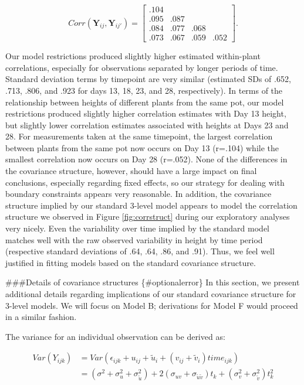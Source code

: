 \documentclass[
]{krantz}
\begin{document}
\[  Corr(\textbf{Y}_{ij},\textbf{Y}_{ij'}) = \left[
          \begin{array}{cccc}
            .104 & & & \\
            .095 & .087 & & \\
            .084 & .077 & .068 & \\
            .073 & .067 & .059 & .052
          \end{array} \right]. \]

Our model restrictions produced slightly higher estimated within-plant correlations, especially for observations separated by longer periods of time. Standard deviation terms by timepoint are very similar (estimated SDs of .652, .713, .806, and .923 for days 13, 18, 23, and 28, respectively). In terms of the relationship between heights of different plants from the same pot, our model restrictions produced slightly higher correlation estimates with Day 13 height, but slightly lower correlation estimates associated with heights at Days 23 and 28. For measurements taken at the same timepoint, the largest correlation between plants from the same pot now occurs on Day 13 (r=.104) while the smallest correlation now occurs on Day 28 (r=.052). None of the differences in the covariance structure, however, should have a large impact on final conclusions, especially regarding fixed effects, so our strategy for dealing with boundary constraints appears very reasonable. In addition, the covariance structure implied by our standard 3-level model appears to model the correlation structure we observed in Figure \ref{fig:corrstruct} during our exploratory analyses very nicely. Even the variability over time implied by the standard model matches well with the raw observed variability in height by time period (respective standard deviations of .64, .64, .86, and .91). Thus, we feel well justified in fitting models based on the standard covariance structure.

\#\#\#Details of covariance structures \{\#optionalerror\}
In this section, we present additional details regarding implications of our standard covariance structure for 3-level models. We will focus on Model B; derivations for Model F would proceed in a similar fashion.

The variance for an individual observation can be derived as:

\begin{align*}
Var(Y_{ijk}) & = Var(\epsilon_{ijk}+u_{ij}+\tilde{u}_{i}+(v_{ij}+\tilde{v}_{i})\textstyle{time}_{ijk}) \\
 & = (\sigma^{2} + \sigma_{u}^{2} + \sigma_{\tilde{u}}^{2}) + 2(\sigma_{uv} + \sigma_{\tilde{u}\tilde{v}})t_k + (\sigma_{v}^{2} + \sigma_{\tilde{v}}^{2})t_{k}^{2}
\end{align*}
\end{document}
